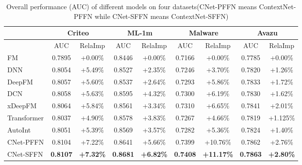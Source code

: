 \documentclass[sigconf]{acmart}
\begin{document}
\begin{table*}
\centering
\caption{Overall performance (AUC) of different models on four datasets(CNet-PFFN  means ContextNet-PFFN while CNet-SFFN means ContextNet-SFFN)}
\begin{tabular}{l|cccccccc}
\toprule
  & \multicolumn{2}{c}{\textbf{Criteo}} & \multicolumn{2}{c}{\textbf{ML-1m}} &
  \multicolumn{2}{c}{\textbf{Malware}} & \multicolumn{2}{c}{\textbf{Avazu}} \\
\midrule
  & AUC & RelaImp   & AUC & RelaImp   & AUC & RelaImp   & AUC & RelaImp \\
\midrule
FM & 0.7895 & +0.00\% & 0.8446 & +0.00\% & 0.7166 & +0.00\% & 0.7785 & +0.00\%\\
DNN & 0.8054 & +5.49\% & 0.8527 & +2.35\% & 0.7246 & +3.70\% & 0.7820 & +1.26\%\\
DeepFM & 0.8057 & +5.60\% & 0.8537 & +2.64\% & 0.7293 & +5.86\% & 0.7833 & +1.72\%\\
\midrule
DCN & 0.8058 & +5.63\% & 0.8595 & +4.32\% & 0.7300 & +6.19\% & 0.7830 & +1.62\%\\
xDeepFM & 0.8064 & +5.84\% & 0.8561 & +3.34\% & 0.7310 & +6.65\% & 0.7841 & +2.01\%\\
Transformer &	0.8037 &	+4.90\% &	0.8578	& +3.83\% &	0.7267 &	+4.66\% &	0.7819 &	+1.125\% \\
AutoInt & 0.8051 & +5.39\% & 0.8569 & +3.57\% & 0.7282 & +5.36\% & 0.7824 & +1.40\%\\
\midrule
CNet-PFFN & 0.8104 & +7.22\% & 0.8641 & +5.66\% & 0.7399 & +10.76\% & 0.7862 & +2.76\%\\
CNet-SFFN & \textbf{0.8107} & \textbf{+7.32\%} & \textbf{0.8681} & \textbf{+6.82\%} & \textbf{0.7408} & \textbf{+11.17\%} & \textbf{0.7863} & \textbf{+2.80\%} \\
\bottomrule
\end{tabular}\label{tab:overalperformance}
\end{table*}
\end{document}
